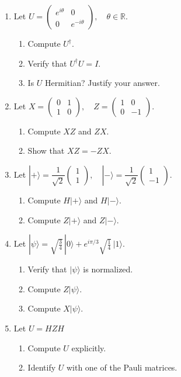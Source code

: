 \documentclass[12pt]{article}
\begin{document}
\begin{enumerate}
\item 
Let
$
U =
\begin{pmatrix}
e^{i\theta} & 0 \\
0 & e^{-i\theta}
\end{pmatrix},
\quad \theta \in \mathbb{R}.
$
\begin{enumerate}
\item Compute $U^\dagger$.
\item Verify that $U^\dagger U = I$.
\item Is $U$ Hermitian? Justify your answer.
\end{enumerate}
\item 
Let
$
X =
\begin{pmatrix}
0 & 1 \\
1 & 0
\end{pmatrix},
\quad
Z =
\begin{pmatrix}
1 & 0 \\
0 & -1
\end{pmatrix}.
$
\begin{enumerate}
\item Compute $XZ$ and $ZX$.
\item Show that $XZ = -ZX$.
\end{enumerate}
\item 
Let
$
|+\rangle = \dfrac{1}{\sqrt{2}}
\begin{pmatrix}
1 \\ 1
\end{pmatrix},
\quad
|-\rangle = \dfrac{1}{\sqrt{2}}
\begin{pmatrix}
1 \\ -1
\end{pmatrix}.
$
\begin{enumerate}
\item Compute $H|+\rangle$ and $H|-\rangle$.
\item Compute $Z|+\rangle$ and $Z|-\rangle$.
\end{enumerate}


\item 
Let
$
|\psi\rangle =
\sqrt{\tfrac{3}{4}}\,|0\rangle
+
e^{i\pi/3}\sqrt{\tfrac{1}{4}}\,|1\rangle.
$
\begin{enumerate}
\item Verify that $|\psi\rangle$ is normalized.
\item Compute $Z|\psi\rangle$.
\item Compute $X|\psi\rangle$.
\end{enumerate}


\item 
Let
$U = HZH$
\begin{enumerate}
\item Compute $U$ explicitly.
\item Identify $U$ with one of the Pauli matrices.
\end{enumerate}

\end{enumerate}
\end{document}
